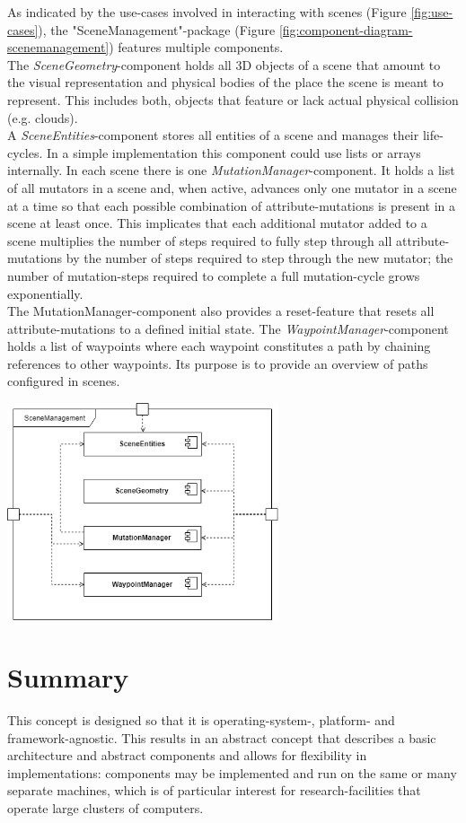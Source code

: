 As indicated by the use-cases involved in interacting with scenes (Figure \ref{fig:use-cases}), the "SceneManagement"-package (Figure \ref{fig:component-diagram-scenemanagement}) features multiple components.\\
The \emph{SceneGeometry}-component holds all 3D objects of a scene that amount to the visual representation and physical bodies of the place the scene is meant to represent. This includes both, objects that feature or lack actual physical collision (e.g. clouds).\\
A \emph{SceneEntities}-component stores all entities of a scene and manages their life-cycles. In a simple implementation this component could use lists or arrays internally.
In each scene there is one \emph{MutationManager}-component. It holds a list of all mutators in a scene and, when active, advances only one mutator in a scene at a time so that each possible combination of attribute-mutations is present in a scene at least once. This implicates that each additional mutator added to a scene multiplies the number of steps required to fully step through all attribute-mutations by the number of steps required to step through the new mutator; the number of mutation-steps required to complete a full mutation-cycle grows exponentially.\\
The MutationManager-component also provides a reset-feature that resets all attribute-mutations to a defined initial state.
The \emph{WaypointManager}-component holds a list of waypoints where each waypoint constitutes a path by chaining references to other waypoints. Its purpose is to provide an overview of paths configured in scenes.\\
\begin{center}
\noindent\includegraphics[width=8cm]{tex/img/ch04/ComponentDiagram_SceneManagement04.png}
\label{fig:component-diagram-scenemanagement}
\end{center}

\section{Summary}
This concept is designed so that it is operating-system-, platform- and framework-agnostic. This results in an abstract concept that describes a basic architecture and abstract components and allows for flexibility in implementations: components may be implemented and run on the same or many separate machines, which is of particular interest for research-facilities that operate large clusters of computers.